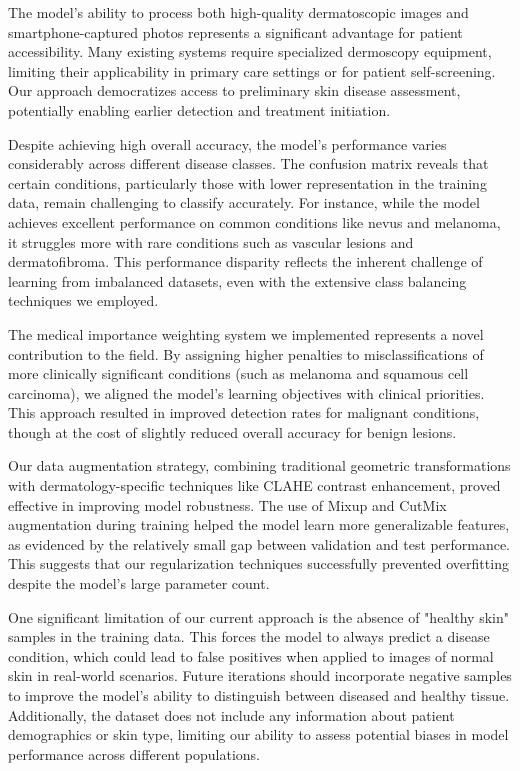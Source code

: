 \documentclass{article} %
\begin{document}
The model's ability to process both high-quality dermatoscopic images and smartphone-captured photos represents a significant advantage for patient accessibility. Many existing systems require specialized dermoscopy equipment, limiting their applicability in primary care settings or for patient self-screening. Our approach democratizes access to preliminary skin disease assessment, potentially enabling earlier detection and treatment initiation.

Despite achieving high overall accuracy, the model's performance varies considerably across different disease classes. The confusion matrix reveals that certain conditions, particularly those with lower representation in the training data, remain challenging to classify accurately. For instance, while the model achieves excellent performance on common conditions like nevus and melanoma, it struggles more with rare conditions such as vascular lesions and dermatofibroma. This performance disparity reflects the inherent challenge of learning from imbalanced datasets, even with the extensive class balancing techniques we employed.

The medical importance weighting system we implemented represents a novel contribution to the field. By assigning higher penalties to misclassifications of more clinically significant conditions (such as melanoma and squamous cell carcinoma), we aligned the model's learning objectives with clinical priorities. This approach resulted in improved detection rates for malignant conditions, though at the cost of slightly reduced overall accuracy for benign lesions.

Our data augmentation strategy, combining traditional geometric transformations with dermatology-specific techniques like CLAHE contrast enhancement, proved effective in improving model robustness. The use of Mixup and CutMix augmentation during training helped the model learn more generalizable features, as evidenced by the relatively small gap between validation and test performance. This suggests that our regularization techniques successfully prevented overfitting despite the model's large parameter count.

One significant limitation of our current approach is the absence of "healthy skin" samples in the training data. This forces the model to always predict a disease condition, which could lead to false positives when applied to images of normal skin in real-world scenarios. Future iterations should incorporate negative samples to improve the model's ability to distinguish between diseased and healthy tissue. Additionally, the dataset does not include any information about patient demographics or skin type, limiting our ability to assess potential biases in model performance across different populations.
\end{document}
